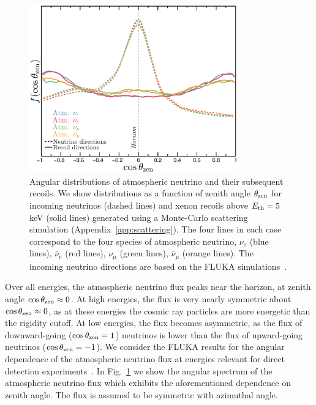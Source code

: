 \begin{figure}
\begin{center}
\includegraphics[trim = 0mm 0 0mm 0mm, clip, width=0.8\textwidth,angle=0]{Figures/AtmNu_zenith.eps}
\caption[Atmospheric neutrino directionality]{Angular distributions of atmospheric neutrino and their subsequent recoils. We show distributions as a function of zenith angle $\theta_{\rm zen}$ for incoming neutrinos (dashed lines) and xenon recoils above $E_{\rm th} = 5$ keV (solid lines) generated using a Monte-Carlo scattering simulation (Appendix~\ref{app:scattering}). The four lines in each case correspond to the four species of atmospheric neutrino, $\nu_e$ (blue lines), $\bar{\nu}_e$ (red lines), $\nu_\mu$ (green lines), $\bar{\nu}_\mu$ (orange lines). The incoming neutrino directions are based on the FLUKA simulations~\cite{Battistoni:2005pd}.} 
\label{fig:FLUKA}
\end{center}
\end{figure} 
Over all energies, the atmospheric neutrino flux peaks near the horizon, at zenith angle $\cos\theta_{\rm zen} \approx 0$. At high energies, the flux is very nearly symmetric about $\cos \theta_{\rm zen} \approx 0$, as at these energies the cosmic ray particles are more energetic than the rigidity cutoff. At low energies, the flux becomes asymmetric, as the flux of downward-going ($\cos \theta_{\rm zen} = 1$) neutrinos is lower than the flux of upward-going neutrinos ($\cos \theta_{\rm zen} = -1$). We consider the FLUKA results for the angular dependence of the atmospheric neutrino flux at energies relevant for direct detection experiments~\cite{Battistoni:2002ew}. In Fig.~\ref{fig:FLUKA} we show the angular spectrum of the atmospheric neutrino flux which exhibits the aforementioned dependence on zenith angle. The flux is assumed to be symmetric with azimuthal angle.

